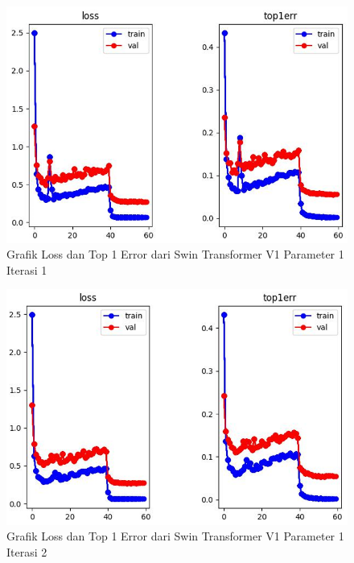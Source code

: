 
\begin{figure}[ht]
  \centering
  \includegraphics[scale=0.6]{gambar/Train SwinV1_0.png}
  \caption{Grafik Loss dan Top 1 Error dari Swin Transformer V1 Parameter 1 Iterasi 1}
  \label{fig:grafiklossdantop1errdariswinv1parameter1iterasi1}
\end{figure}

\begin{figure}[ht]
  \centering
  \includegraphics[scale=0.6]{gambar/Train SwinV1_1.png}
  \caption{Grafik Loss dan Top 1 Error dari Swin Transformer V1 Parameter 1 Iterasi 2}
  \label{fig:grafiklossdantop1errdariswinv1parameter1iterasi2}
\end{figure}

